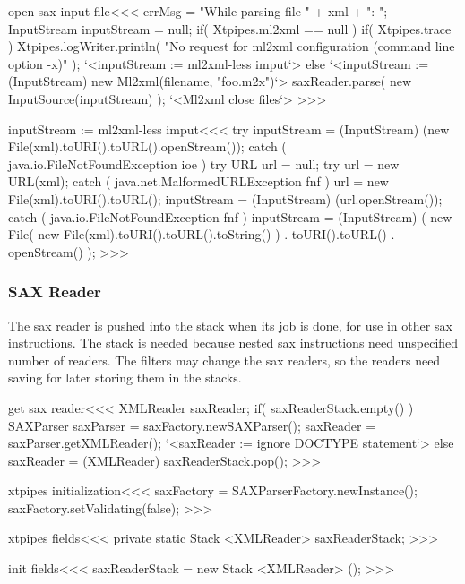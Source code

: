 \documentclass{article}
\begin{document}
{\<open sax input file\><<<
errMsg = "While parsing file " + xml + ": ";
InputStream inputStream = null;            
if( Xtpipes.ml2xml == null ){
   if( Xtpipes.trace ){
       Xtpipes.logWriter.println( 
         "No request for ml2xml configuration (command line option -x)" ); 
   }
   `<inputStream := ml2xml-less imput`>
} else {
   `<inputStream := (InputStream) new Ml2xml(filename, "foo.m2x")`>
}
saxReader.parse( new InputSource(inputStream) );
`<Ml2xml close files`>
>>>

\<inputStream := ml2xml-less imput\><<<
try{
    inputStream = (InputStream) (new File(xml).toURI().toURL().openStream());  
} catch ( java.io.FileNotFoundException ioe ){           
    try{
       URL url = null;
       try {
           url = new URL(xml);
       } catch ( java.net.MalformedURLException fnf ){           
           url = new File(xml).toURI().toURL();
       }
       inputStream = (InputStream) (url.openStream());  
    } catch ( java.io.FileNotFoundException fnf ){           
        inputStream = (InputStream)
           (
              new File( new File(xml).toURI().toURL().toString() )
              . toURI().toURL()
              . openStream()
           );  
}   }
>>>





\subsubsection{SAX Reader}

The sax reader is pushed into the stack when its job is done, for
use in other sax instructions.  The stack is needed because nested sax
instructions need unspecified number of readers. The filters may
change the sax readers, so the readers need saving for later storing
them in the stacks.

\<get sax reader\><<<
XMLReader saxReader;
if( saxReaderStack.empty() ){
   SAXParser saxParser = saxFactory.newSAXParser();
   saxReader = saxParser.getXMLReader();
   `<saxReader := ignore DOCTYPE statement`>
} else {
   saxReader = (XMLReader) saxReaderStack.pop();
}
>>>




\<xtpipes initialization\><<<
saxFactory = SAXParserFactory.newInstance();
saxFactory.setValidating(false);
>>>

\<xtpipes fields\><<<
private static Stack <XMLReader> saxReaderStack;
>>>


\<init fields\><<<
saxReaderStack = new Stack <XMLReader> ();
>>>

}
\end{document}
